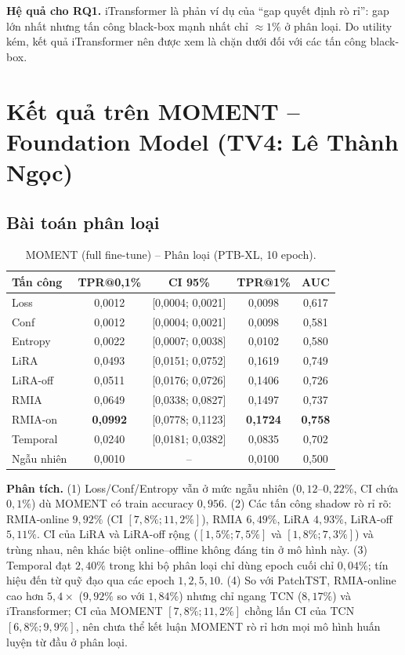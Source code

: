 \documentclass[12pt,a4paper]{report}
\begin{document}
\textbf{Hệ quả cho RQ1.} iTransformer là phản ví dụ của ``gap quyết định rò rỉ'': gap lớn nhất nhưng tấn công black-box mạnh nhất chỉ $\approx 1\%$ ở phân loại. Do utility kém, kết quả iTransformer nên được xem là chặn dưới đối với các tấn công black-box.

\section{Kết quả trên MOMENT -- Foundation Model (TV4: Lê Thành Ngọc)}
\label{sec:moment_analysis}

\subsection{Bài toán phân loại}

\begin{table}[H]
\centering
\caption{MOMENT (full fine-tune) -- Phân loại (PTB-XL, 10 epoch).}
\label{tab:moment_cls}
\begin{tabular}{lcccc}
\toprule
\textbf{Tấn công} & \textbf{TPR@0,1\%} & \textbf{CI 95\%} & \textbf{TPR@1\%} & \textbf{AUC} \\
\midrule
Loss      & 0,0012 & [0,0004; 0,0021] & 0,0098 & 0,617 \\
Conf      & 0,0012 & [0,0004; 0,0021] & 0,0098 & 0,581 \\
Entropy   & 0,0022 & [0,0007; 0,0038] & 0,0102 & 0,580 \\
LiRA      & 0,0493 & [0,0151; 0,0752] & 0,1619 & 0,749 \\
LiRA-off  & 0,0511 & [0,0176; 0,0726] & 0,1406 & 0,726 \\
RMIA      & 0,0649 & [0,0338; 0,0827] & 0,1497 & 0,737 \\
RMIA-on   & \textbf{0,0992} & [0,0778; 0,1123] & \textbf{0,1724} & \textbf{0,758} \\
Temporal  & 0,0240 & [0,0181; 0,0382] & 0,0835 & 0,702 \\
\midrule
Ngẫu nhiên & 0,0010 & -- & 0,0100 & 0,500 \\
\bottomrule
\end{tabular}
\end{table}

\textbf{Phân tích.} (1) Loss/Conf/Entropy vẫn ở mức ngẫu nhiên ($0{,}12$--$0{,}22\%$, CI chứa $0{,}1\%$) dù MOMENT có train accuracy $0{,}956$. (2) Các tấn công shadow rò rỉ rõ: RMIA-online $9{,}92\%$ (CI $[7{,}8\%; 11{,}2\%]$), RMIA $6{,}49\%$, LiRA $4{,}93\%$, LiRA-off $5{,}11\%$. CI của LiRA và LiRA-off rộng ($[1{,}5\%; 7{,}5\%]$ và $[1{,}8\%; 7{,}3\%]$) và trùng nhau, nên khác biệt online--offline không đáng tin ở mô hình này. (3) Temporal đạt $2{,}40\%$ trong khi bộ phân loại chỉ dùng epoch cuối chỉ $0{,}04\%$; tín hiệu đến từ quỹ đạo qua các epoch $1, 2, 5, 10$. (4) So với PatchTST, RMIA-online cao hơn $5{,}4\times$ ($9{,}92\%$ so với $1{,}84\%$) nhưng chỉ ngang TCN ($8{,}17\%$) và iTransformer; CI của MOMENT $[7{,}8\%; 11{,}2\%]$ chồng lấn CI của TCN $[6{,}8\%; 9{,}9\%]$, nên chưa thể kết luận MOMENT rò rỉ hơn mọi mô hình huấn luyện từ đầu ở phân loại.
\end{document}

